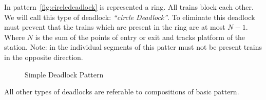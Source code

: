 \documentclass{ewic}
\begin{document}
In pattern~\ref{fig:circledeadlock} is represented a ring. All trains block each other. We will call this type of deadlock:  \emph{``circle Deadlock''}. To eliminate this deadlock must prevent that the trains which are present in the ring are at most $N-1$. Where $N$ is the sum of the points of entry or exit and tracks platform of the station. Note: in the individual segments of this patter must not be present trains in the opposite direction.

\begin{figure}[!htp]
 \centering

 

\caption{Simple Deadlock Pattern}
 \label{fig:simpledeadlockpattern}
 \end{figure}



All other types of deadlocks are referable to compositions of basic pattern.


\end{document}
